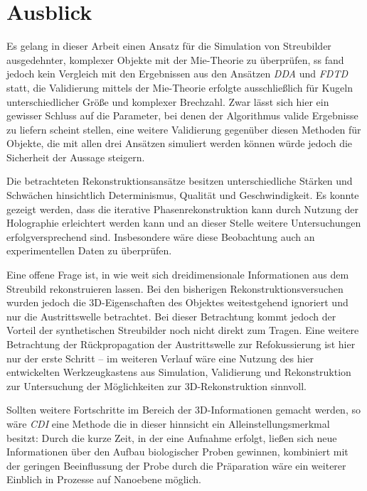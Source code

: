 \chapter{Ausblick}
Es gelang in dieser Arbeit einen Ansatz für die Simulation von Streubilder  ausgedehnter, komplexer Objekte mit der Mie-Theorie zu überprüfen, ss fand jedoch kein Vergleich mit den Ergebnissen aus den Ansätzen \textit{DDA} und \textit{FDTD} statt, die Validierung mittels der Mie-Theorie erfolgte ausschließlich für Kugeln unterschiedlicher Größe und komplexer Brechzahl. Zwar lässt sich hier ein gewisser Schluss auf die Parameter, bei denen der Algorithmus valide Ergebnisse zu liefern scheint stellen, eine weitere Validierung gegenüber diesen Methoden für Objekte, die mit allen drei Ansätzen simuliert werden können würde jedoch die Sicherheit der Aussage steigern.

Die betrachteten Rekonstruktionsansätze besitzen unterschiedliche Stärken und Schwächen hinsichtlich Determinismus, Qualität und Geschwindigkeit. Es konnte gezeigt werden, dass die iterative Phasenrekonstruktion kann durch Nutzung der Holographie erleichtert werden kann und an dieser Stelle weitere Untersuchungen erfolgversprechend sind. Insbesondere wäre diese Beobachtung auch an experimentellen Daten zu überprüfen.

Eine offene Frage ist, in wie weit sich dreidimensionale Informationen aus dem Streubild rekonstruieren lassen. Bei den bisherigen Rekonstruktionsversuchen wurden jedoch die 3D-Eigenschaften des Objektes weitestgehend ignoriert und nur die Austrittswelle betrachtet. Bei dieser Betrachtung kommt jedoch der Vorteil der synthetischen Streubilder noch nicht direkt zum Tragen. Eine weitere Betrachtung der Rückpropagation der Austrittswelle zur Refokussierung ist hier nur der erste Schritt -- im weiteren Verlauf wäre eine Nutzung des hier entwickelten Werkzeugkastens aus Simulation, Validierung und Rekonstruktion zur Untersuchung der Möglichkeiten zur 3D-Rekonstruktion sinnvoll. 

Sollten weitere Fortschritte im Bereich der 3D-Informationen gemacht werden, so wäre \textit{CDI} eine Methode die in dieser hinnsicht ein Alleinstellungsmerkmal besitzt: Durch die kurze Zeit, in der eine Aufnahme erfolgt, ließen sich neue Informationen über den Aufbau biologischer Proben gewinnen, kombiniert mit der geringen Beeinflussung der Probe durch die Präparation wäre ein weiterer Einblich in Prozesse auf Nanoebene möglich. 